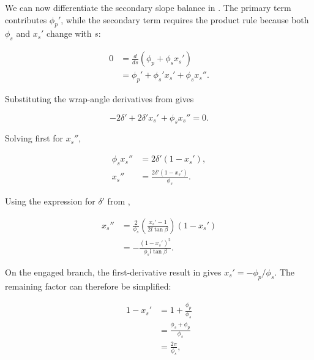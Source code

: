 \documentclass[11pt]{report}
\numberwithin{equation}{section}
\begin{document}
We can now differentiate the secondary slope balance in
. The primary term
contributes \(\phi_p'\), while the secondary term requires the product rule
because both \(\phi_s\) and \(x_s'\) change with \(s\):

\begin{align}
    0
    &=
    \frac{d}{ds}
    \left(
        \phi_p+\phi_s x_s'
    \right)
    \nonumber\\
    &=
    \phi_p'
    +
    \phi_s'x_s'
    +
    \phi_s x_s''.
    \label{eq:secondary_coordinate_curvature_balance}
\end{align}

Substituting the wrap-angle derivatives from
 gives

\begin{equation}
    -2\delta'
    +
    2\delta'x_s'
    +
    \phi_s x_s''
    =0.
    \label{eq:secondary_coordinate_curvature_delta_form}
\end{equation}

Solving first for \(x_s''\),

\begin{align}
    \phi_s x_s''
    &=
    2\delta'(1-x_s'),
    \nonumber\\
    x_s''
    &=
    \frac{2\delta'(1-x_s')}{\phi_s}.
    \label{eq:secondary_coordinate_curvature_first_form}
\end{align}

Using the expression for \(\delta'\) from
,

\begin{align}
    x_s''
    &=
    \frac{2}{\phi_s}
    \left(
        \frac{x_s'-1}{2l\tan\beta}
    \right)
    (1-x_s')
    \nonumber\\
    &=
    -\frac{(1-x_s')^2}
    {\phi_s l\tan\beta}.
    \label{eq:secondary_coordinate_curvature_slope_form}
\end{align}

On the engaged branch, the first-derivative result in
 gives
\(x_s'=-\phi_p/\phi_s\). The remaining factor can therefore be simplified:

\begin{align}
    1-x_s'
    &=
    1+\frac{\phi_p}{\phi_s}
    \nonumber\\
    &=
    \frac{\phi_s+\phi_p}{\phi_s}
    \nonumber\\
    &=
    \frac{2\pi}{\phi_s},
    \label{eq:secondary_coordinate_one_minus_slope}
\end{align}
\end{document}
